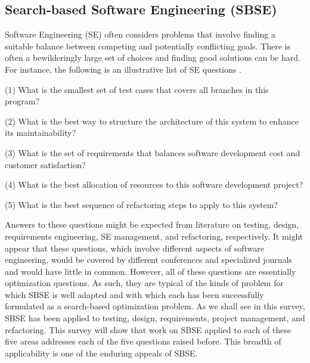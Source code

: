 \documentclass[conference]{IEEEtran}
\begin{document}


\subsection{Search-based Software Engineering (SBSE)}

Software Engineering (SE) often considers problems that involve finding a suitable
balance between competing and potentially conflicting goals. There is often a bewilderingly 
large set of choices and finding good solutions can be hard. For instance, the
following is an illustrative list of SE questions \cite{10.1145/2379776.2379787}.

(1) What is the smallest set of test cases that covers all branches in this program?

(2) What is the best way to structure the architecture of this system to enhance its
maintainability?

(3) What is the set of requirements that balances software development cost and 
customer satisfaction?

(4) What is the best allocation of resources to this software development project?

(5) What is the best sequence of refactoring steps to apply to this system?

Answers to these questions might be expected from literature on testing, design,
requirements engineering, SE management, and refactoring, respectively. It might
appear that these questions, which involve different aspects of software engineering,
would be covered by different conferences and specialized journals and would have little
in common. However, all of these questions are essentially optimization questions. As
such, they are typical of the kinds of problem for which SBSE is well adapted and with
which each has been successfully formulated as a search-based optimization problem.
As we shall see in this survey, SBSE has been applied to testing, design, requirements,
project management, and refactoring. This survey will show that work on SBSE applied
to each of these five areas addresses each of the five questions raised before. This
breadth of applicability is one of the enduring appeals of SBSE.
\end{document}
